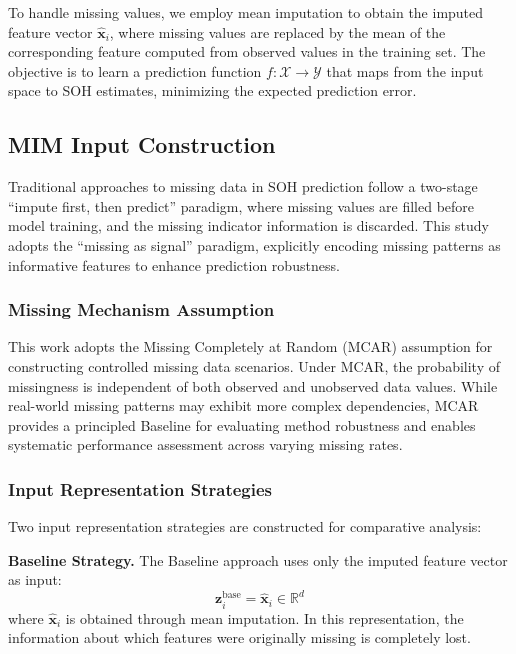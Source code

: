\documentclass[5p,times]{elsarticle}
\begin{document}
To handle missing values, we employ mean imputation to obtain the imputed feature vector $\hat{\mathbf{x}}_i$, where missing values are replaced by the mean of the corresponding feature computed from observed values in the training set. The objective is to learn a prediction function $f: \mathcal{X} \rightarrow \mathcal{Y}$ that maps from the input space to SOH estimates, minimizing the expected prediction error.

\subsection{MIM Input Construction}\label{sec:mim}

Traditional approaches to missing data in SOH prediction follow a two-stage ``impute first, then predict'' paradigm, where missing values are filled before model training, and the missing indicator information is discarded. This study adopts the ``missing as signal'' paradigm, explicitly encoding missing patterns as informative features to enhance prediction robustness.

\subsubsection{Missing Mechanism Assumption}

This work adopts the Missing Completely at Random (MCAR) assumption for constructing controlled missing data scenarios\cite{little2002statistical,rubin1976inference}. Under MCAR, the probability of missingness is independent of both observed and unobserved data values. While real-world missing patterns may exhibit more complex dependencies, MCAR provides a principled Baseline for evaluating method robustness and enables systematic performance assessment across varying missing rates.

\subsubsection{Input Representation Strategies}

Two input representation strategies are constructed for comparative analysis:

\textbf{Baseline Strategy.} The Baseline approach uses only the imputed feature vector as input:
\begin{equation}
    \mathbf{z}_i^{\text{base}} = \hat{\mathbf{x}}_i \in \mathbb{R}^{d}
\end{equation}
where $\hat{\mathbf{x}}_i$ is obtained through mean imputation. In this representation, the information about which features were originally missing is completely lost.
\end{document}
